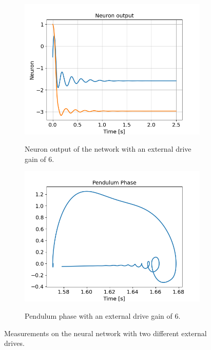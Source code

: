 \documentclass{cmc}
\begin{document}
\begin{figure}[H]
\begin{subfigure}[b]{0.45\textwidth}
    { \centering
      \includegraphics[width=0.99\textwidth]{figures/3b_6_neuron_output.png} }
    \caption{Neuron output of the network with an external drive gain of 6.}
    \label{fig:3b_1_neuron_output}
  \end{subfigure}
  \begin{subfigure}[b]{0.45\textwidth}
    { \centering
      \includegraphics[width=0.99\textwidth]{figures/3b_6_pendulum_phase.png} }
    \caption{Pendulum phase with an external drive gain of 6.}
    \label{fig:3b_pendulum_phase}
  \end{subfigure}
  \caption{Measurements on the neural network with two different external drives.}
  \label{fig:3a}
\end{figure}
\end{document}
